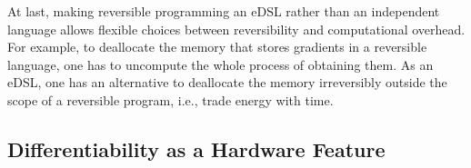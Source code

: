 \documentclass{article}
\newcommand{\<}{\langle}
\renewcommand{\>}{\rangle}
\theoremstyle{definition}\newtheorem{definition}{\textit{Definition}}
\begin{document}
At last, making reversible programming an eDSL rather than an independent language allows flexible choices between reversibility and computational overhead. For example, to deallocate the memory that stores gradients in a reversible language, one has to uncompute the whole process of obtaining them.
As an eDSL, one has an alternative to deallocate the memory irreversibly outside the scope of a reversible program, i.e., trade energy with time.



\subsection{Differentiability as a Hardware Feature}\label{sec:hardware}
\end{document}
